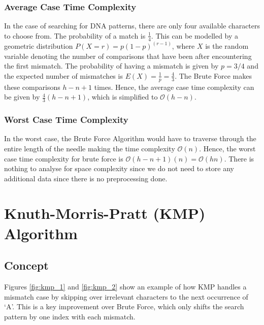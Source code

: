 \subsubsection*{Average Case Time Complexity}
In the case of searching for DNA patterns, there are only four available characters to choose from. The probability of a match is $\frac{1}{4}$. This can be modelled by a geometric distribution $P(X=r) = p(1-p)^(r-1)$, where $X$ is the random variable denoting the number of comparisons that have been after encountering the first mismatch. The probability of having a mismatch is given by $p = 3/4$ and the expected number of mismatches is $E(X) = \frac{1}{p} = \frac{4}{3}$. The Brute Force makes these comparisons $h-n+1$ times. Hence, the average case time complexity can be given by $\frac{4}{3}(h-n+1)$, which is simplified to $\mathcal{O}(h-n)$.

\subsubsection*{Worst Case Time Complexity}
In the worst case, the Brute Force Algorithm would have to traverse through the entire length of the needle making the time complexity $\mathcal{O}(n)$. Hence, the worst case time complexity for brute force is $\mathcal{O}(h - n + 1)(n) = \mathcal{O}(hn)$. There is nothing to analyse for space complexity since we do not need to store any additional data since there is no preprocessing done.

\section*{Knuth-Morris-Pratt (KMP) Algorithm}

\subsection*{Concept}
Figures \ref{fig:kmp_1} and \ref{fig:kmp_2} show an example of how KMP handles a mismatch case by skipping over irrelevant characters to the next occurrence of `A'. This is a key improvement over Brute Force, which only shifts the search pattern by one index with each mismatch. 


